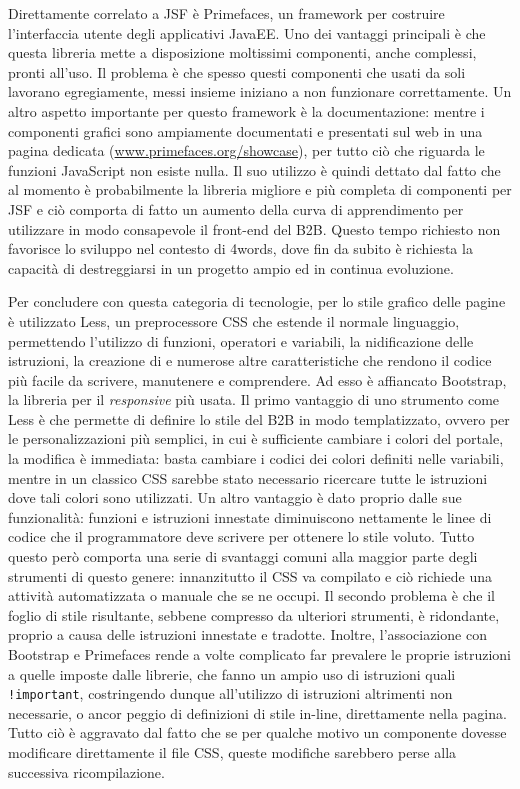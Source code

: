 Direttamente correlato a JSF è Primefaces, un framework per costruire l'interfaccia utente degli applicativi JavaEE. Uno dei vantaggi principali è che questa libreria mette a disposizione moltissimi componenti, anche complessi, pronti all'uso. Il problema è che spesso questi componenti che usati da soli lavorano egregiamente, messi insieme iniziano a non funzionare correttamente. Un altro aspetto importante per questo framework è la documentazione: mentre i componenti grafici sono ampiamente documentati e presentati sul web in una pagina dedicata (\url{www.primefaces.org/showcase}), per tutto ciò che riguarda le funzioni JavaScript non esiste nulla. Il suo utilizzo è quindi dettato dal fatto che al momento è probabilmente la libreria migliore e più completa di componenti per JSF e ciò comporta di fatto un aumento della curva di apprendimento per utilizzare in modo consapevole il front-end del B2B. Questo tempo richiesto non favorisce lo sviluppo nel contesto di 4words, dove fin da subito è richiesta la capacità di destreggiarsi in un progetto ampio ed in continua evoluzione.

Per concludere con questa categoria di tecnologie, per lo stile grafico delle pagine è utilizzato Less, un preprocessore CSS che estende il normale linguaggio, permettendo l'utilizzo di funzioni, operatori e variabili, la nidificazione delle istruzioni, la creazione di  e numerose altre caratteristiche che rendono il codice più facile da scrivere, manutenere e comprendere.\autocite{wikipedia} Ad esso è affiancato Bootstrap, la libreria per il \textit{responsive} più usata. Il primo vantaggio di uno strumento come Less è che permette di definire lo stile del B2B in modo templatizzato, ovvero per le personalizzazioni più semplici, in cui è sufficiente cambiare i colori del portale, la modifica è immediata: basta cambiare i codici dei colori definiti nelle variabili, mentre in un classico CSS sarebbe stato necessario ricercare tutte le istruzioni dove tali colori sono utilizzati. Un altro vantaggio è dato proprio dalle sue funzionalità: funzioni e istruzioni innestate diminuiscono nettamente le linee di codice che il programmatore deve scrivere per ottenere lo stile voluto. Tutto questo però comporta una serie di svantaggi comuni alla maggior parte degli strumenti di questo genere: innanzitutto il CSS va compilato e ciò richiede una attività automatizzata o manuale che se ne occupi. Il secondo problema è che il foglio di stile risultante, sebbene compresso da ulteriori strumenti, è ridondante, proprio a causa delle istruzioni innestate e tradotte. Inoltre, l'associazione con Bootstrap e Primefaces rende a volte complicato far prevalere le proprie istruzioni a quelle imposte dalle librerie, che fanno un ampio uso di istruzioni quali \texttt{!important}, costringendo dunque all'utilizzo di istruzioni altrimenti non necessarie, o ancor peggio di definizioni di stile in-line, direttamente nella pagina. Tutto ciò è aggravato dal fatto che se per qualche motivo un componente dovesse modificare direttamente il file CSS, queste modifiche sarebbero perse alla successiva ricompilazione.

